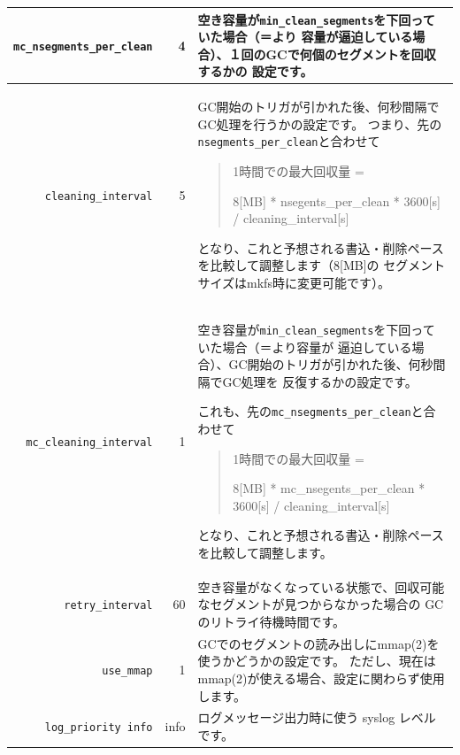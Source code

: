 \documentclass[mingoth,a4paper]{jsarticle}
\begin{document}
\begin{center}
\begin{supertabular}[h]{|r|r|p{30em}|}
\verb|mc_nsegments_per_clean| & 4 &
空き容量が\verb|min_clean_segments|を下回っていた場合（＝より
容量が逼迫している場合）、１回のGCで何個のセグメントを回収するかの
設定です。 \\ \hline

\verb|cleaning_interval| & 5 &
GC開始のトリガが引かれた後、何秒間隔でGC処理を行うかの設定です。
つまり、先の\verb|nsegments_per_clean|と合わせて
\begin{quote}
1時間での最大回収量 =

8[MB] * nsegents\_per\_clean * 3600[s] / cleaning\_interval[s]
\end{quote}
となり、これと予想される書込・削除ペースを比較して調整します（8[MB]の
セグメントサイズはmkfs時に変更可能です）。 \\ \hline

\verb|mc_cleaning_interval| & 1 &
空き容量が\verb|min_clean_segments|を下回っていた場合（＝より容量が
逼迫している場合）、GC開始のトリガが引かれた後、何秒間隔でGC処理を
反復するかの設定です。

これも、先の\verb|mc_nsegments_per_clean|と合わせて
\begin{quote}
1時間での最大回収量 =

8[MB] * mc\_nsegents\_per\_clean * 3600[s] / cleaning\_interval[s]
\end{quote}
となり、これと予想される書込・削除ペースを比較して調整します。 \\ \hline

\verb|retry_interval| & 60 &
空き容量がなくなっている状態で、回収可能なセグメントが見つからなかった場合の
GCのリトライ待機時間です。 \\ \hline

\verb|use_mmap| & 1 &
GCでのセグメントの読み出しにmmap(2)を使うかどうかの設定です。
ただし、現在はmmap(2)が使える場合、設定に関わらず使用します。 \\ \hline

\verb|log_priority info| & info &
ログメッセージ出力時に使う syslog レベルです。 \\ \hline

\end{supertabular}
\end{center}
\end{document}
